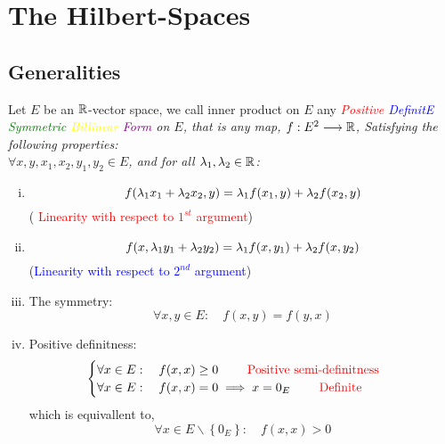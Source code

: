 \documentclass{report}
\begin{document}
\chapter{The Hilbert-Spaces}  
\section{Generalities}
\begin{definition}
	Let $E $ be an $\mathbb{R}  $-vector space, we call
	inner product on $E$ any 
	\it \textcolor{red}{Positive} 
	\textcolor{blue}{DefinitE} 
	\textcolor{green}{Symmetric} 
	\textcolor{yellow}{Billinear}
	\textcolor{purple}{Form}
	\normalfont
	on 
	$E$, that is any map,
	$ f :E^2   \longrightarrow \mathbb{R}  $, 
	Satisfying the following properties:\\
	$\forall x,y,x_1, x_2, y_1, y_2 \in  E $, and for 
	all $\lambda_1,\lambda_2 \in  \mathbb{R}  $:
	\begin{enumerate}[(i)]
		\item 
			\[
			f(\lambda_1 x_1 + \lambda_2 x_2, y)  =
		\lambda_1f(x_1, y) + \lambda_2 f(x_2, y) 
			\]
			\hfill
			( \textcolor{red}{Linearity with respect
			to $1 ^{st} $ argument})
		\item 
			\[
			f(x, \lambda_1 y_1 + \lambda_2 y_2)  =
			\lambda_1 f(x, y_1)  + 
			\lambda_2 f(x, y_2) 
			\]
			\hfill
			(\textcolor{blue}{Linearity with respect
			to $2 ^{nd} $ argument})
		\item The symmetry:
			\[
			\forall x,y \in  E : \quad 
			f(x,y) = f(y,x) 
			\]
		\item Positive definitness: 
			\begin{align*}
			\begin{cases}
			\forall x \in  E :
			\quad f(x,x) \geq 0 
			\quad \quad 
			\text{ \textcolor{red}{Positive semi-definitness }}  \\
			\forall x \in  E: 
			\quad f(x,x) = 0 \implies 
			x= 0_{E} 
			\quad \quad 
			\text{ \textcolor{red}{Definite}} 
			\end{cases}
			\end{align*}
			which is equivallent to, 
			\[
			\forall x \in  E \backslash 
			\left\{ 0_{E} \right\} : 
			\quad f(x,x) > 0
			\]
	\end{enumerate}
\end{definition}
\end{document}
